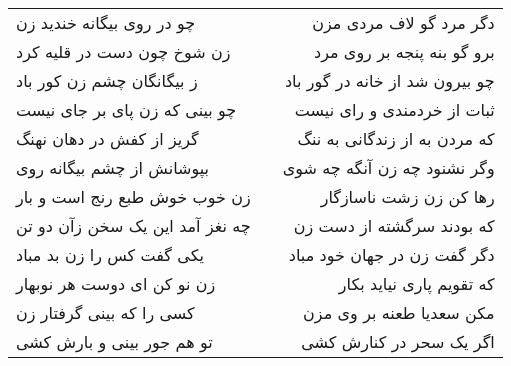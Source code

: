 \begin{center}
\begin{longtable}{l p{0.5cm} r}
چو در روی بیگانه خندید زن
&&
دگر مرد گو لاف مردی مزن
\\
زن شوخ چون دست در قلیه کرد
&&
برو گو بنه پنجه بر روی مرد
\\
ز بیگانگان چشم زن کور باد
&&
چو بیرون شد از خانه در گور باد
\\
چو بینی که زن پای بر جای نیست
&&
ثبات از خردمندی و رای نیست
\\
گریز از کفش در دهان نهنگ
&&
که مردن به از زندگانی به ننگ
\\
بپوشانش از چشم بیگانه روی
&&
وگر نشنود چه زن آنگه چه شوی
\\
زن خوب خوش طبع رنج است و بار
&&
رها کن زن زشت ناسازگار
\\
چه نغز آمد این یک سخن زآن دو تن
&&
که بودند سرگشته از دست زن
\\
یکی گفت کس را زن بد مباد
&&
دگر گفت زن در جهان خود مباد
\\
زن نو کن ای دوست هر نوبهار
&&
که تقویم پاری نیاید بکار
\\
کسی را که بینی گرفتار زن
&&
مکن سعدیا طعنه بر وی مزن
\\
تو هم جور بینی و بارش کشی
&&
اگر یک سحر در کنارش کشی
\\
\end{longtable}
\end{center}
